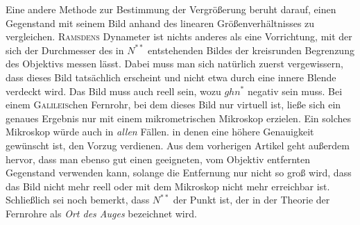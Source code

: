 Eine andere Methode zur Bestimmung der Vergrößerung beruht darauf, einen Gegenstand mit seinem Bild anhand des linearen Größenverhältnisses zu vergleichen. \textsc{Ramsdens} Dynameter ist nichts anderes als eine Vorrichtung, mit der sich der Durchmesser des in $N^{**}$ entstehenden Bildes der kreisrunden Begrenzung des Objektivs messen lässt. Dabei muss man sich natürlich zuerst vergewissern, dass dieses Bild tatsächlich erscheint und nicht etwa durch eine innere Blende verdeckt wird. Das Bild muss auch reell sein, wozu $ghn^*$ negativ sein muss. Bei einem \textsc{Galileis}chen Fernrohr, bei dem dieses Bild nur virtuell ist, ließe sich ein genaues Ergebnis nur mit einem mikrometrischen Mikroskop erzielen. Ein solches Mikroskop würde auch in \textit{allen} Fällen. in denen eine höhere Genauigkeit gewünscht ist, den Vorzug verdienen. Aus dem vorherigen Artikel geht außerdem hervor, dass man ebenso gut einen geeigneten, vom Objektiv entfernten Gegenstand verwenden kann, solange die Entfernung nur nicht so groß wird, dass das Bild nicht mehr reell oder mit dem Mikroskop nicht mehr erreichbar ist. Schließlich sei noch bemerkt, dass $N^{**}$ der Punkt ist, der in der Theorie der Fernrohre als \textit{Ort des Auges} bezeichnet wird.

